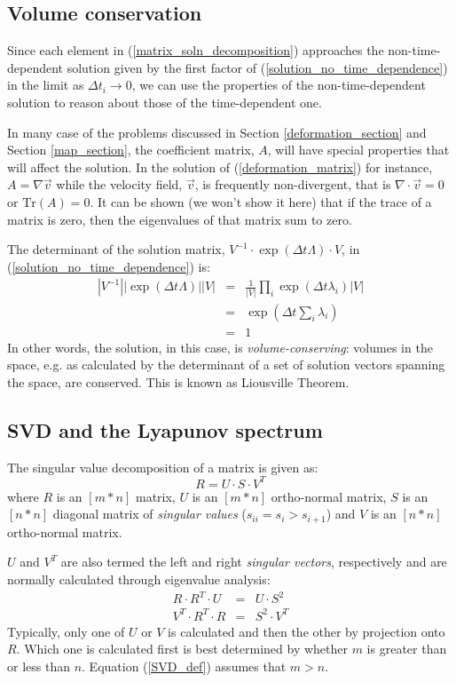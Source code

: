 \documentclass[12pt]{article}
\begin{document}
\subsection{Volume conservation}

Since each element in (\ref{matrix_soln_decomposition}) approaches the
non-time-dependent solution given by the first factor of 
(\ref{solution_no_time_dependence}) in the limit as $\Delta t_i\rightarrow 0$, 
we can use the properties of the non-time-dependent solution to
reason about those of the time-dependent one.

In many case of the problems discussed in Section \ref{deformation_section}
and Section \ref{map_section}, the coefficient matrix, $A$, will have
special properties that will affect the solution.
In the solution of (\ref{deformation_matrix}) for instance, 
$A=\nabla \vec v$ while the velocity field, $\vec v$, is frequently non-divergent,
that is $\nabla \cdot \vec v=0$ or $\mathrm{Tr}(A)=0$.
It can be shown (we won't show it here) that 
if the trace of a matrix is zero, then the eigenvalues of that matrix
sum to zero.

The determinant of the solution matrix,
$V^{-1}\cdot\exp(\Delta t\Lambda)\cdot V$, in (\ref{solution_no_time_dependence}) is:
\begin{eqnarray}
|V^{-1}||\exp(\Delta t\Lambda)||V| & = & \frac{1}{|V|}\prod_i \exp(\Delta t \lambda_i) |V| \\
& = & \exp\left(\Delta t \sum_i \lambda_i\right) \\
& = & 1
\end{eqnarray}
In other words, the solution, in this case, is {\it volume-conserving}:
volumes in the space, e.g. as calculated by the determinant of a set of 
solution vectors
spanning the space, are conserved.  This is known as Liousville Theorem.

\subsection{SVD and the Lyapunov spectrum}

The singular value decomposition of a matrix is given as:
\begin{equation}
R=U\cdot S\cdot V^T
\label{SVD_def}
\end{equation}
where $R$ is an $[m*n]$ matrix, $U$ is an $[m*n]$ ortho-normal
matrix, $S$ is an $[n*n]$ diagonal matrix of {\it singular values}
($s_{ii}=s_i>s_{i+1}$) and $V$ is an $[n*n]$ ortho-normal matrix.

$U$ and $V^T$ are also termed the left and right {\it singular vectors}, 
respectively and are normally calculated through eigenvalue analysis:
\begin{eqnarray}
R\cdot R^T \cdot U & = & U\cdot S^2 \\
V^T \cdot R^T \cdot R & = & S^2 \cdot V^T
\end{eqnarray}
Typically, only one of $U$ or $V$ is calculated and then the other by projection
onto $R$.  Which one is calculated first is best determined by whether $m$
is greater than or less than $n$.  Equation (\ref{SVD_def}) assumes that 
$m>n$.
\end{document}
